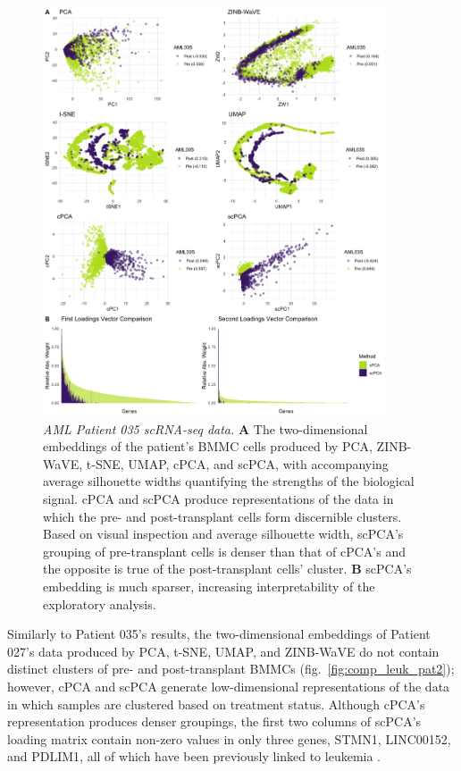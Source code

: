 \begin{figure}[!htbp]
  \centering
  \includegraphics[width=0.9\textwidth]{figures/aml035_results.png}
  \caption{{\em AML Patient 035 scRNA-seq data.} 
  \textbf{A} The two-dimensional embeddings of the patient's BMMC cells produced by PCA, ZINB-WaVE, t-SNE, UMAP, cPCA, and scPCA, with accompanying average silhouette widths quantifying the strengths of the biological signal. cPCA and scPCA produce representations of the data in which the pre- and post-transplant cells form discernible clusters. Based on visual inspection and average silhouette width, scPCA's grouping of pre-transplant cells is denser than that of cPCA's and the opposite is true of the post-transplant cells' cluster. \textbf{B} scPCA's embedding is much sparser, increasing interpretability of the exploratory analysis.}
  \label{fig:comp_leuk_pat1}
\end{figure}

Similarly to Patient 035's results, the two-dimensional embeddings of Patient 027's data produced by PCA, t-SNE, UMAP, and ZINB-WaVE do not contain distinct clusters of pre- and post-transplant BMMCs (fig.~\ref{fig:comp_leuk_pat2}); however, cPCA and scPCA generate low-dimensional representations of the data in which samples are clustered based on treatment status. Although cPCA's representation produces denser groupings, the first two columns of scPCA's loading matrix contain non-zero values in only three genes, STMN1, LINC00152, and PDLIM1, all of which have been previously linked to leukemia \cite{Machado-Neto2014,Zhang2019,Holleman2004}. 
\FloatBarrier